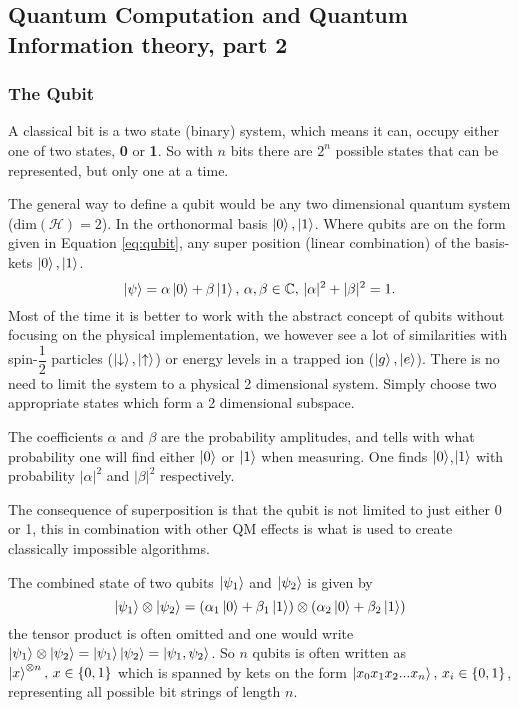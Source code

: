 \subsection{Quantum Computation and Quantum Information theory, part 2}

\subsubsection{The Qubit}
A classical bit is a two state (binary) system, which means it can, occupy either one of two states, \textbf{0} or \textbf{1}. So with $n$ bits there are $2^n$ possible states that can be represented, but only one at a time.

The general way to define a qubit would be any two dimensional quantum system ($\text{dim}(\mathcal{H}) = 2$). In the orthonormal basis ${\ket{0},\ket{1}}$. Where qubits are on the form given in Equation \ref{eq:qubit}, any super position (linear combination) of the basis-kets $\ket{0},\ket{1}$.
\begin{equation}
\label{eq:qubit}
\ket{\psi} = \alpha\ket{0} + \beta\ket{1},\,\alpha,\beta \in \mathbb{C},\, |\alpha|^2 + |\beta|^2 = 1.
\end{equation}
Most of the time it is better to work with the abstract concept of qubits without focusing on the physical implementation, we however see a lot of similarities with spin-$\dfrac{1}{2}$ particles ($\ket{\downarrow},\ket{\uparrow}$) or energy levels in a trapped ion ($\ket{g},\ket{e}$). There is no need to limit the system to a physical 2 dimensional system. Simply choose two appropriate states which form a 2 dimensional subspace.

The coefficients $\alpha$ and $\beta$ are the probability amplitudes, and tells with what probability one will find either $\ket{0}$ or $\ket{1}$ when measuring. One finds $\ket{0}$,$\ket{1}$ with probability $|\alpha|^2$ and $|\beta|^2$ respectively.

The consequence of superposition is that the qubit is not limited to just either 0 or 1, this in combination with other QM effects is what is used to create classically impossible algorithms\cite{shor}\cite{Grover}.

The combined state of two qubits $\ket{\psi_1}$ and $\ket{\psi_2}$ is given by 
\begin{equation}
\ket{\psi_1} \otimes \ket{\psi_2} = (\alpha_1\ket{0} + \beta_1\ket{1})\otimes(\alpha_2\ket{0} + \beta_2\ket{1})
\end{equation}
the tensor product is often omitted and one would write $\ket{\psi_1} \otimes \ket{\psi_2} = \ket{\psi_1}\ket{\psi_2} = \ket{\psi_1, \psi_2}$.
So $n$ qubits is often written as $\ket{x}^{\otimes n},\, x \in \{0,1\}$ which is spanned by kets on the form $\ket{x_0x_1x_2...x_n},\, x_i \in \{0,1\}$, representing all possible bit strings of length $n$.

